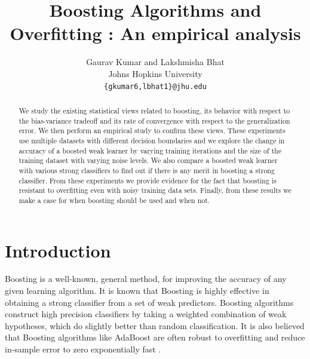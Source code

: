 \documentclass[letterpaper,11pt]{article}
\title{Boosting Algorithms and Overfitting : An empirical analysis}
\date{}
\author{Gaurav Kumar and Lakshmisha Bhat\\
  Johns Hopkins University\\
  \texttt{\{gkumar6,lbhat1\}@jhu.edu}}
\begin{document}
\large
\maketitle
\thispagestyle{headings}

\vspace{-.3in}

\thispagestyle{empty}

\begin{abstract}
We study the existing statistical views related to boosting, its behavior with respect to the bias-variance tradeoff and its rate of convergence with respect to the generalization error. We then perform an empirical study to confirm these views. These experiments use multiple datasets with different decision boundaries and we explore the change in accuracy of a boosted weak learner by varying training iterations and the size of the training dataset with varying noise levels. We also compare a boosted weak learner with various strong classifiers to find out if there is any merit in boosting a strong classifier. From these experiments we provide evidence for the fact that boosting is resistant to overfitting even with noisy training data sets. Finally, from these results we make a case for when boosting should be used and when not. 
\end{abstract}

\setcounter{secnumdepth}{-1} 

\section{Introduction}
Boosting \cite{s90} is a well-known, general method, for improving the accuracy of any given learning algorithm. It is known that Boosting is highly effective in obtaining a strong classifier from a set of weak predictors. Boosting algorithms construct high precision classifiers by taking a weighted combination of weak hypotheses, which do slightly better than random classification. It is also believed that Boosting algorithms like AdaBoost \cite{S99} are often robust to overfitting and reduce in-sample error to zero exponentially fast \cite{mrs}.
\end{document}
